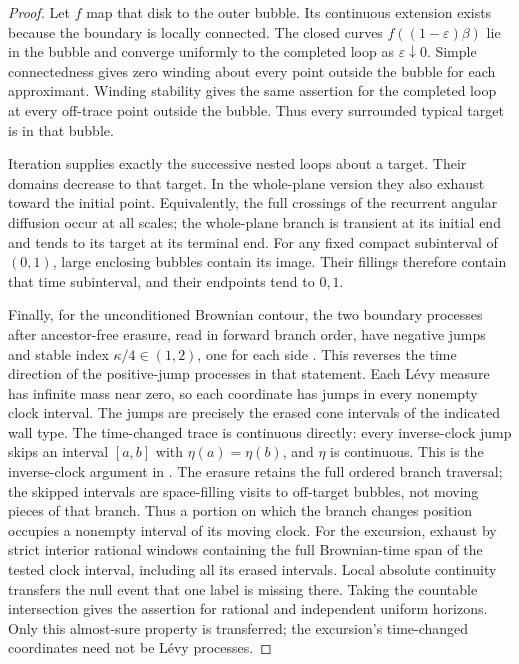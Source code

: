 \begin{proof}
Let $f$ map that disk to the outer bubble.  Its continuous extension
exists because the boundary is locally connected.  The closed curves
$f((1-\varepsilon)\beta)$ lie in the bubble and converge uniformly to
the completed loop as $\varepsilon\downarrow0$.  Simple connectedness
gives zero winding about every point outside the bubble for each
approximant.  Winding stability gives the same assertion for the
completed loop at every off-trace point outside the bubble.  Thus every
surrounded typical target is in that bubble.

Iteration supplies exactly the successive nested loops about a target.
Their domains decrease to that target.  In the whole-plane version they
also exhaust toward the initial point.  Equivalently, the full crossings
of the recurrent angular diffusion occur at all scales; the whole-plane
branch is transient at its initial end and tends to its target at its
terminal end.  For any fixed compact subinterval of $(0,1)$, large
enclosing bubbles contain its image.  Their fillings therefore contain
that time subinterval, and their endpoints tend to $0,1$.

Finally, for the unconditioned Brownian contour, the two boundary
processes after ancestor-free erasure, read in forward branch order,
have negative jumps and stable index
$\kappa/4\in(1,2)$, one for each side
\cite[Proposition~1.13]{DMSMating}.  This reverses the time direction
of the positive-jump processes in that statement.  Each L\'evy measure has
infinite mass near zero, so each coordinate has jumps in every nonempty
clock interval.  The jumps are precisely the erased cone intervals of
the indicated wall type.  The time-changed trace is continuous directly:
every inverse-clock jump skips an interval $[a,b]$ with
$\eta(a)=\eta(b)$, and $\eta$ is continuous.  This is the inverse-clock
argument in \cite[Proposition~10.6]{DMSMating}.
The erasure retains the full ordered branch traversal; the skipped
intervals are space-filling visits to off-target bubbles, not moving
pieces of that branch.  Thus a portion on which the branch changes
position occupies a nonempty interval of its moving clock.
For the excursion, exhaust by strict interior rational windows
containing the full Brownian-time span of the tested clock interval,
including all its erased intervals.  Local absolute continuity
transfers the null event that one label is missing there.  Taking the
countable intersection gives the assertion for rational and independent
uniform horizons.  Only this almost-sure property is transferred;
the excursion's time-changed coordinates need not be L\'evy processes.
\end{proof}

